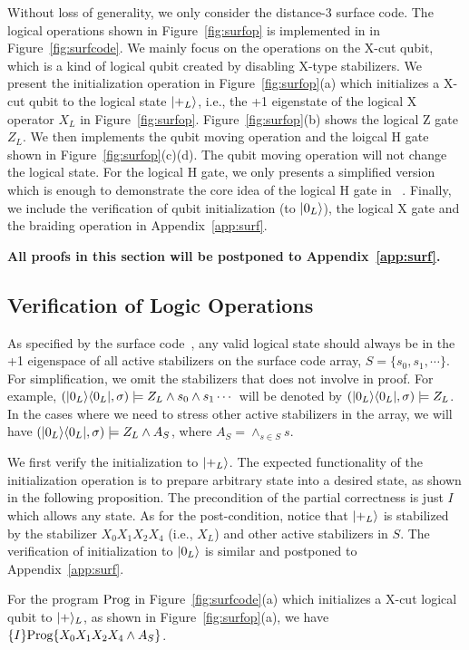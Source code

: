Without loss of generality, we only consider  the distance-3 surface code.
The logical operations shown in Figure~\ref{fig:surfop} is implemented in {\langname} in Figure~\ref{fig:surfcode}. %
We mainly focus on the operations on the X-cut qubit, which is a kind of logical qubit created by disabling X-type stabilizers.
We present the initialization operation in Figure~\ref{fig:surfop}(a) which initializes a X-cut qubit to the logical state $\vert +_L \rangle$, i.e., the +1 eigenstate of the logical X operator $X_L$ in Figure~\ref{fig:surfop}.
Figure~\ref{fig:surfop}(b) %
shows the logical Z gate $Z_L$. 
We then implements the qubit moving operation and the loigcal H gate shown in Figure~\ref{fig:surfop}(c)(d).  The qubit moving operation 
will not change the logical state. For the logical H gate, we only presents a simplified version which is enough to demonstrate the core idea of the logical H gate in ~\cite{Fowler2012SurfaceCT}. Finally, we include the verification of qubit initialization (to $\vert 0_L \rangle$), the logical X gate  and the braiding operation in  Appendix~\ref{app:surf}. %

\textbf{All proofs in this section will be postponed to Appendix~\ref{app:surf}.}







\subsection{Verification of Logic Operations}

As specified by the surface code~\cite{Fowler2012SurfaceCT}, any valid logical state should always be in the +1 eigenspace of all active stabilizers on the surface code array, $S = \{s_0,s_1,\cdots\}$. %
For simplification, we omit the stabilizers that does not involve in proof. For example, %
$(\vert 0_L \rangle\langle 0_L \vert,\sigma)\models Z_L \wedge s_0 \wedge s_1 \cdots$ will be denoted by $(\vert 0_L \rangle\langle 0_L \vert,\sigma)\models Z_L$.
In the cases where we need to stress other active stabilizers in the array, we will have $(\vert 0_L \rangle\langle 0_L \vert,\sigma)\models Z_L \wedge A_S$, where $A_S = \wedge_{s\in S}s$.


We first verify the initialization to  $\vert +_L \rangle$. 
The expected functionality of the initialization operation is to prepare arbitrary state into a desired state, as shown in the following proposition. The precondition of the partial correctness is just $I$ which allows any state. As for the post-condition,
notice that $\vert +_L \rangle$ is stabilized by the stabilizer $X_0X_1X_2X_4$ (i.e., $X_L$) and other active stabilizers in $S$. 
The verification of initialization to $\vert 0_L \rangle$ is similar and postponed to Appendix~\ref{app:surf}.
\nothmskip
\begin{proposition}
For the program $\text{Prog}$ in Figure~\ref{fig:surfcode}(a) which initializes a X-cut logical qubit to $\vert + \rangle_L$, as shown in Figure~\ref{fig:surfop}(a), we have
$\{I\}\text{Prog}\{X_0X_1X_2X_4 \wedge A_S\}$.
\end{proposition} \nothmskip


